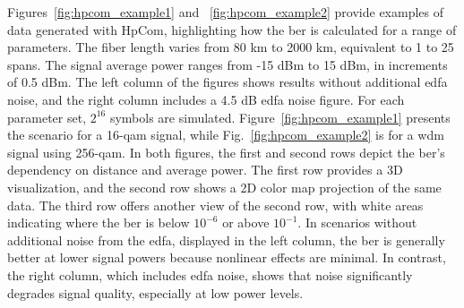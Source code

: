 Figures~\ref{fig:hpcom_example1} and ~\ref{fig:hpcom_example2} provide examples of data generated with HpCom, highlighting how the \acrshort{ber} is calculated for a range of parameters. The fiber length varies from 80 km to 2000 km, equivalent to 1 to 25 spans. 
The signal average power ranges from -15 dBm to 15 dBm, in increments of 0.5 dBm. The left column of the figures shows results without additional \acrshort{edfa} noise, and the right column includes a 4.5 dB \acrshort{edfa} noise figure. For each parameter set, $2^{16}$ symbols are simulated. Figure~\ref{fig:hpcom_example1} presents the scenario for a 16-\acrshort{qam} signal, while Fig.~\ref{fig:hpcom_example2} is for a \acrshort{wdm} signal using 256-\acrshort{qam}. In both figures, the first and second rows depict the \acrshort{ber}'s dependency on distance and average power. The first row provides a 3D visualization, and the second row shows a 2D color map projection of the same data. The third row offers another view of the second row, with white areas indicating where the \acrshort{ber} is below $10^{-6}$ or above $10^{-1}$. In scenarios without additional noise from the \gls{edfa}, displayed in the left column, the \acrshort{ber} is generally better at lower signal powers because nonlinear effects are minimal. In contrast, the right column, which includes \acrshort{edfa} noise, shows that noise significantly degrades signal quality, especially at low power levels.


